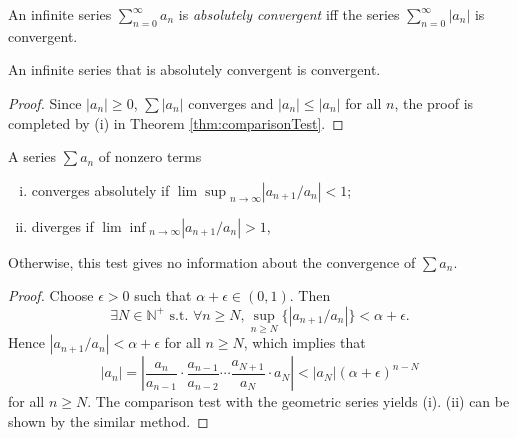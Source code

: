 \begin{defn}
  \label{def:absoluteConvergence}
  An infinite series $\sum_{n=0}^{\infty} a_n$
  is \emph{absolutely convergent}
  iff the series $\sum_{n=0}^{\infty} |a_n|$ is convergent.
\end{defn}

\begin{lem}
  \label{lem:absolutelyConvergenceSeriesConverge}
  An infinite series that is absolutely convergent
  is convergent.
\end{lem}
\begin{proof}
  Since $|a_{n}|\ge 0$,  $\sum |a_{n}|$ converges and
  $|a_{n}|\le |a_{n}|$ for all $n$, the proof is completed by
  (i) in Theorem \ref{thm:comparisonTest}.
\end{proof}

\begin{thm}
  \label{thm:ratioTest}
  A series $\sum a_n$ of nonzero terms
  \begin{enumerate}[(i)]\itemsep0em
  \item converges absolutely if
    ${\lim\sup}_{n\rightarrow\infty}|a_{n+1}/a_n|<1$;
  \item diverges if ${\lim\inf}_{n\rightarrow\infty}|a_{n+1}/a_n|>1$,
  \end{enumerate}
  Otherwise, this test gives no information
  about the convergence of $\sum a_n$.
\end{thm}
\begin{proof}
  Choose $\epsilon>0$ such that $\alpha+\epsilon\in(0,1)$. Then
  \begin{displaymath}
    \exists N\in \mathbb{N}^{+} \text{ s.t. }
    \forall n\ge N, \sup_{n\ge N}\{|a_{n+1}/a_{n}|\}<\alpha+\epsilon.
  \end{displaymath}
  Hence $|a_{n+1}/a_{n}|<\alpha+\epsilon$ for all $n\ge N$,
  which implies that
  \begin{displaymath}
    |a_{n}|=\left|\frac{a_{n}}{a_{n-1}}\cdot \frac{a_{n-1}}{a_{n-2}}
     \cdots \frac{a_{N+1}}{a_{N}}\cdot a_{N}  \right|
    <|a_{N}|(\alpha+\epsilon)^{n-N}
  \end{displaymath}
  for all $n\ge N$.
  The comparison test with the geometric series yields (i).
  (ii) can be shown by the similar method.
\end{proof}


